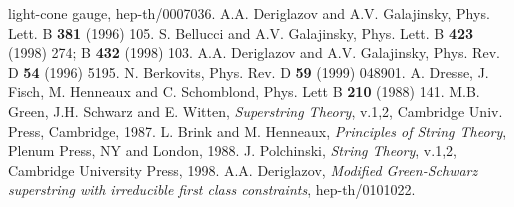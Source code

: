 \documentclass[a4paper]{article}
\begin{document}
\begin{thebibliography}{nn}
{light-cone gauge}, hep-th/0007036.
\bibitem{} A.A. Deriglazov and A.V. Galajinsky,  
Phys. Lett. B {\bf 381} (1996) 105.
\bibitem{} S. Bellucci and A.V. Galajinsky,
Phys. Lett. B {\bf 423} (1998) 274; B {\bf 432} (1998) 103.
\bibitem{} A.A. Deriglazov and A.V. Galajinsky,
Phys. Rev. D {\bf 54} (1996) 5195.
\bibitem{} N. Berkovits, Phys. Rev. D {\bf 59} (1999) 048901.
\bibitem{} A. Dresse, J. Fisch, M. Henneaux and C. Schomblond, 
Phys. Lett B {\bf 210} (1988) 141.
\bibitem{} M.B. Green, J.H. Schwarz and E. Witten,
{\it{Superstring Theory}}, v.1,2, Cambridge Univ. Press, Cambridge, 1987. 
\bibitem{} L. Brink and M. Henneaux, {\it{Principles of String Theory}},
Plenum Press, NY and London, 1988.
\bibitem{} J. Polchinski, {\it{String Theory}}, v.1,2,
Cambridge University Press, 1998.
\bibitem{} A.A. Deriglazov, {\em{Modified \coordHE{} Green-Schwarz superstring 
with irreducible first class constraints}}, hep-th/0101022.
\end{thebibliography}
\end{document}
